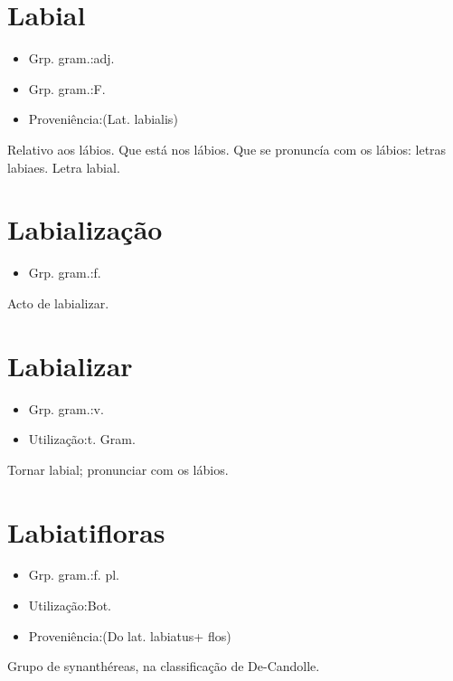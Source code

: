 \section{Labial}
\begin{itemize}
\item {Grp. gram.:adj.}
\end{itemize}
\begin{itemize}
\item {Grp. gram.:F.}
\end{itemize}
\begin{itemize}
\item {Proveniência:(Lat. \textunderscore labialis\textunderscore )}
\end{itemize}
Relativo aos lábios.
Que está nos lábios.
Que se pronuncía com os lábios: \textunderscore letras labiaes\textunderscore .
Letra labial.
\section{Labialização}
\begin{itemize}
\item {Grp. gram.:f.}
\end{itemize}
Acto de \textunderscore labializar\textunderscore .
\section{Labializar}
\begin{itemize}
\item {Grp. gram.:v.}
\end{itemize}
\begin{itemize}
\item {Utilização:t. Gram.}
\end{itemize}
Tornar labial; pronunciar com os lábios.
\section{Labiatifloras}
\begin{itemize}
\item {Grp. gram.:f. pl.}
\end{itemize}
\begin{itemize}
\item {Utilização:Bot.}
\end{itemize}
\begin{itemize}
\item {Proveniência:(Do lat. \textunderscore labiatus\textunderscore  + \textunderscore flos\textunderscore )}
\end{itemize}
Grupo de synanthéreas, na classificação de De-Candolle.
